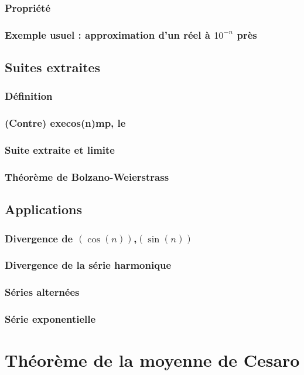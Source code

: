 \documentclass[12pt,a4paper,french]{book}
\begin{document}
			\subsubsection{Propriété}
			\subsubsection{Exemple usuel : approximation d'un réel à $10^{-n}$ près}
		\subsection{Suites extraites}
			\subsubsection{Définition}
			\subsubsection{(Contre) execos(n)mp, le}
			\subsubsection{Suite extraite et limite}
			\subsubsection{Théorème de Bolzano-Weierstrass}
		\subsection{Applications}
			\subsubsection{Divergence de $(\cos(n))$,$(\sin(n))$}
			\subsubsection{Divergence de la série harmonique}
			\subsubsection{Séries alternées}
			\subsubsection{Série exponentielle}
	\section{Théorème de la moyenne de Cesaro}
\end{document}
